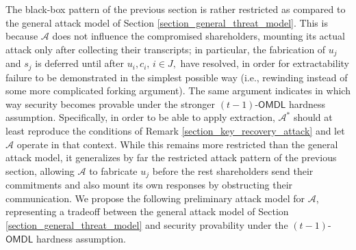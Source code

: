\documentclass{iacrtrans}
\begin{document}
The black-box pattern of the previous section
is rather restricted as compared to
the general attack model of
Section \ref{section_general_threat_model}.
This is because $\mathcal{A}$ does
not influence the compromised shareholders,
mounting its actual attack only after collecting their
transcripts; in particular,
the fabrication of $u_j$ and $s_j$
is deferred until after $u_i, c_i,\hspace{2pt} i \in J,$
have resolved,
in order for extractability failure
to be demonstrated in the simplest possible way
(i.e., rewinding instead of some more complicated forking argument).
The same argument
indicates in which way security becomes provable under
the stronger $(t-1)$-$\mathsf{OMDL}$ hardness assumption.
Specifically, in order to be able to apply extraction,
$\mathcal{A}^*$ should at least reproduce
the conditions of Remark \ref{section_key_recovery_attack}
and let $\mathcal{A}$ operate in that context.
While this remains more restricted than the general attack model,
it generalizes by far the restricted attack pattern of
the previous section, allowing
$\mathcal{A}$ to fabricate $u_j$ before the rest shareholders
send their commitments and also mount its own responses
by obstructing their communication.
We propose the following preliminary attack model for $\mathcal{A}$,
representing a tradeoff between
the general attack model of Section \ref{section_general_threat_model}
and security provability
under the $(t-1)$-$\mathsf{OMDL}$ hardness assumption.
\end{document}

